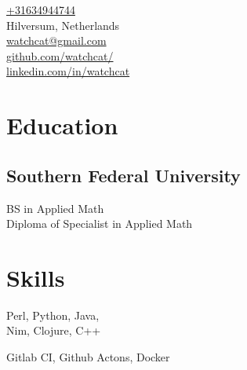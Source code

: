 \documentclass[]{hieudo-build}
\begin{document}
%
%
{
    \faPhone{} \href{tel:+31634944744}{+31634944744} \\
    \faHome{} Hilversum, Netherlands \\
	\faEnvelope{} \href{mailto:watchcat@gmail.com}{ watchcat@gmail.com}\\
	\faGithub{} \href{https://github.com/watchcat/}{ github.com/watchcat/}\\
	\faLinkedinSquare{} \href{https://www.linkedin.com/in/watchcat/}{   linkedin.com/in/watchcat}
}
    
%
%
\begin{minipage}[t]{0.34\textwidth} 

\section{Education} 

\subsection{Southern Federal University}
BS in Applied Math \\
Diploma of Specialist in Applied Math \\
\sectionsep{}

\section{Skills}
Perl, Python, Java, \\
Nim, Clojure, C++

\vspace{0.9em} %

Gitlab CI, Github Actons, Docker \\

\vspace{0.9em} %


\end{minipage}
\end{document}
